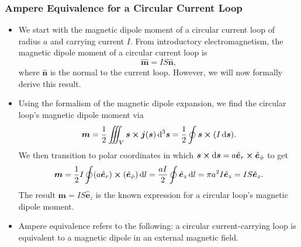 \documentclass[11pt, a4paper]{article}
\newcommand{\diff}{\mathop{}\!\mathrm{d}} %
\renewcommand{\vec}[1]{\bm{#1}} %
\newcommand{\uvec}[1]{\hat{\vec{#1}}} %
\newcommand{\m}{\vec{m}}  %
\renewcommand{\j}{\vec{j}}  %
\newcommand{\s}{\vec{s}}  %
\newcommand{\ds}{\diff^{3} \s}  %
\begin{document}
\subsubsection{Ampere Equivalence for a Circular Current Loop}
\begin{itemize}
	\item We start with the magnetic dipole moment of a circular current loop of radius $ a $ and carrying current $ I $. From introductory electromagnetism, the magnetic dipole moment of a circular current loop is
    \begin{equation*}
       \uvec{m} = IS\uvec{n},
    \end{equation*}
    where $ \uvec{n} $ is the normal to the current loop. However, we will now formally derive this result.
	
	\item Using the formalism of the magnetic dipole expansion, we find the circular loop's magnetic dipole moment via
	\begin{equation*}
		\m = \frac{1}{2}\iiint_{V}\s \cross \j(\s)\ds =  \frac{1}{2}\oint \s \cross (I \diff \vec{s}).
	\end{equation*}
    We then transition to polar coordinates in which $ \vec{s} \cross \diff \s = a \uvec{e}_{r} \cross \uvec{e}_{\phi} $ to get
	\begin{equation*}
		\m = \frac{1}{2}I\oint (a \uvec{e}_{r}) \cross  (\uvec{e}_{\phi})\diff l = \frac{aI}{2} \oint \uvec{e}_{z} \diff l = \pi a^{2}I \uvec{e}_{z} = IS\uvec{e}_{z}.
	\end{equation*}
    The result $ \m = I S \uvec{e}_{z} $ is the known expression for a circular loop's magnetic dipole moment.
	
	\item Ampere equivalence refers to the following: a circular current-carrying loop is equivalent to a magnetic dipole in an external magnetic field.
\end{itemize}
\end{document}
